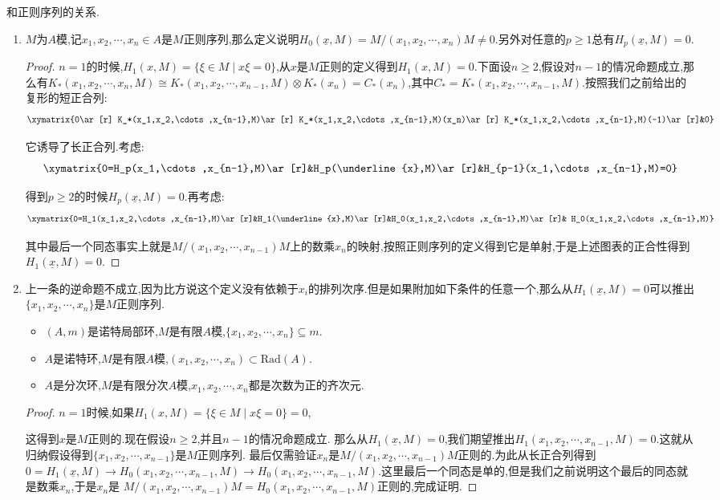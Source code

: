 和正则序列的关系.
\begin{enumerate}
	\item $M$为$A$模,记$x_1,x_2,\cdots,x_n\in A$是$M$正则序列,那么定义说明$H_0(\underline{x},M)=M/(x_1,x_2,\cdots,x_n)M\not=0$.另外对任意的$p\ge1$总有$H_p(\underline{x},M)=0$.
	\begin{proof}
		
		$n=1$的时候,$H_1(x,M)=\{\xi\in M\mid x\xi=0\}$,从$x$是$M$正则的定义得到$H_1(x,M)=0$.下面设$n\ge2$,假设对$n-1$的情况命题成立,那么有$K_*(x_1,x_2,\cdots,x_n,M)\cong K_*(x_1,x_2,\cdots,x_{n-1},M)\otimes K_*(x_n)=C_*(x_n)$,其中$C_*=K_*(x_1,x_2,\cdots,x_{n-1},M)$.按照我们之前给出的复形的短正合列:
		$$\xymatrix{0\ar[r] K_*(x_1,x_2,\cdots,x_{n-1},M)\ar[r] K_*(x_1,x_2,\cdots,x_{n-1},M)(x_n)\ar[r] K_*(x_1,x_2,\cdots,x_{n-1},M)(-1)\ar[r]&0}$$
		
		它诱导了长正合列.考虑:
		$$\xymatrix{0=H_p(x_1,\cdots,x_{n-1},M)\ar[r]&H_p(\underline{x},M)\ar[r]&H_{p-1}(x_1,\cdots,x_{n-1},M)=0}$$
		
		得到$p\ge2$的时候$H_p(\underline{x},M)=0$.再考虑:
		$$\xymatrix{0=H_1(x_1,x_2,\cdots,x_{n-1},M)\ar[r]&H_1(\underline{x},M)\ar[r]&H_0(x_1,x_2,\cdots,x_{n-1},M)\ar[r]& H_0(x_1,x_2,\cdots,x_{n-1},M)}$$
		
		其中最后一个同态事实上就是$M/(x_1,x_2,\cdots,x_{n-1})M$上的数乘$x_n$的映射,按照正则序列的定义得到它是单射,于是上述图表的正合性得到$H_1(\underline{x},M)=0$.
	\end{proof}
	\item 上一条的逆命题不成立,因为比方说这个定义没有依赖于$x_i$的排列次序.但是如果附加如下条件的任意一个,那么从$H_1(\underline{x},M)=0$可以推出$\{x_1,x_2,\cdots,x_n\}$是$M$正则序列.
	\begin{itemize}
		\item $(A,m)$是诺特局部环,$M$是有限$A$模,$\{x_1,x_2,\cdots,x_n\}\subseteq m$.
		\item $A$是诺特环,$M$是有限$A$模,$(x_1,x_2,\cdots,x_n)\subset\mathrm{Rad}(A)$.
		\item $A$是分次环,$M$是有限分次$A$模,$x_1,x_2,\cdots,x_n$都是次数为正的齐次元.
	\end{itemize}
	\begin{proof}
		
		$n=1$时候,如果$H_1(x,M)=\{\xi\in M\mid x\xi=0\}=0$,
		
		这得到$x$是$M$正则的.现在假设$n\ge2$,并且$n-1$的情况命题成立.
		那么从$H_1(\underline{x},M)=0$,我们期望推出$H_1(x_1,x_2,\cdots,x_{n-1},M)=0$.这就从归纳假设得到$\{x_1,x_2,\cdots,x_{n-1}\}$是$M$正则序列.
		最后仅需验证$x_n$是$M/(x_1,x_2,\cdots,x_{n-1})M$正则的.为此从长正合列得到
		$0=H_1(\underline{x},M)\to H_0(x_1,x_2,\cdots,x_{n-1},M)\to H_0(x_1,x_2,\cdots,x_{n-1},M)$.这里最后一个同态是单的,但是我们之前说明这个最后的同态就是数乘$x_n$,于是$x_n$是
		$M/(x_1,x_2,\cdots,x_{n-1})M=H_0(x_1,x_2,\cdots,x_{n-1},M)$正则的,完成证明.
		

\end{proof}
\end{enumerate}
